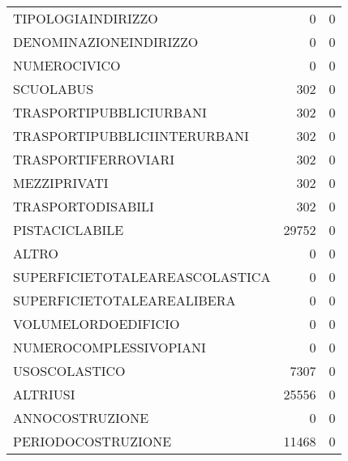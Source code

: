 \documentclass{article}
\begin{document}
\begin{table}[ht]
\begin{tabular}{lrr}
		TIPOLOGIAINDIRIZZO &   0 &   0 \\ 
		DENOMINAZIONEINDIRIZZO &   0 &   0 \\ 
		NUMEROCIVICO &   0 &   0 \\ 
		SCUOLABUS & 302 &   0 \\ 
		TRASPORTIPUBBLICIURBANI & 302 &   0 \\ 
		TRASPORTIPUBBLICIINTERURBANI & 302 &   0 \\ 
		TRASPORTIFERROVIARI & 302 &   0 \\ 
		MEZZIPRIVATI & 302 &   0 \\ 
		TRASPORTODISABILI & 302 &   0 \\ 
		PISTACICLABILE & 29752 &   0 \\ 
		ALTRO &   0 &   0 \\ 
		SUPERFICIETOTALEAREASCOLASTICA &   0 &   0 \\ 
		SUPERFICIETOTALEAREALIBERA &   0 &   0 \\ 
		VOLUMELORDOEDIFICIO &   0 &   0 \\ 
		NUMEROCOMPLESSIVOPIANI &   0 &   0 \\ 
		USOSCOLASTICO & 7307 &   0 \\ 
		ALTRIUSI & 25556 &   0 \\ 
		ANNOCOSTRUZIONE &   0 &   0 \\ 
		PERIODOCOSTRUZIONE & 11468 &   0 \\ 
		\hline
	\end{tabular}
\end{table}
\end{document}
